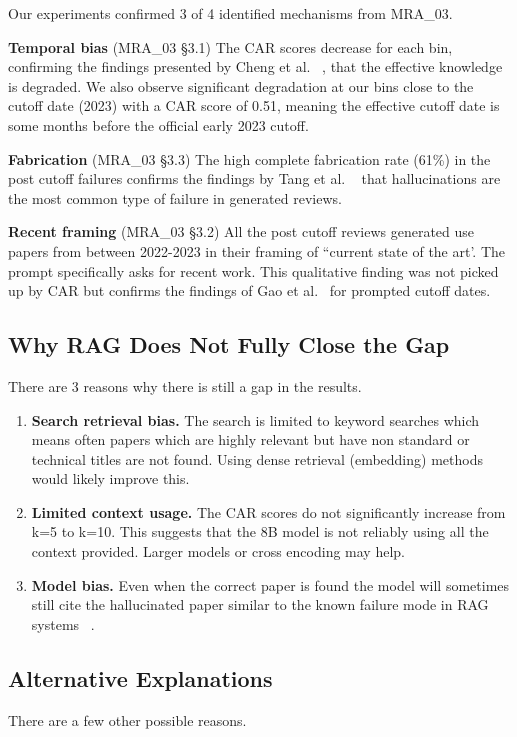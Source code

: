 \documentclass[conference]{IEEEtran}
\begin{document}
Our experiments confirmed 3 of 4 identified mechanisms from MRA\_03.

\textbf{Temporal bias} (MRA\_03 \S3.1) The CAR scores decrease for each bin, confirming the
findings presented by Cheng et al. ~\cite{cheng2024}, that the effective knowledge
is degraded. We also observe significant degradation at our bins close to the
cutoff date (2023) with a CAR score of 0.51, meaning the effective cutoff date
is some months before the official early 2023 cutoff.

\textbf{Fabrication} (MRA\_03 \S3.3) The high complete fabrication rate
(61\%) in the post cutoff failures confirms the findings by Tang
et al. ~\cite{tang2025} that hallucinations are the most common type of failure
in generated reviews.

\textbf{Recent framing} (MRA\_03 \S3.2) All the post cutoff reviews generated
use papers from between 2022-2023 in their framing of ``current state of the art’.
The prompt specifically asks for recent work. This qualitative finding was
not picked up by CAR but confirms the findings of Gao et al.~\cite{gao2025} for
prompted cutoff dates.

\subsection{Why RAG Does Not Fully Close the Gap}
There are 3 reasons why there is still a gap in the results.

\begin{enumerate}[leftmargin=,topsep=2pt]
\item \textbf{Search retrieval bias. } The search is limited to keyword searches
which means often papers which are highly relevant but have non standard or
technical titles are not found. Using dense retrieval (embedding) methods
would likely improve this.
\item \textbf{Limited context usage. } The CAR scores do not significantly increase
from k=5 to k=10. This suggests that the 8B model is not reliably using all
the context provided. Larger models or cross encoding may help.
\item \textbf{Model bias. } Even when the correct paper is found the model will
sometimes still cite the hallucinated paper similar to the known failure
mode in RAG systems ~\cite{gao2024rag}.
\end{enumerate}

\subsection{Alternative Explanations}
There are a few other possible reasons.
\end{document}
